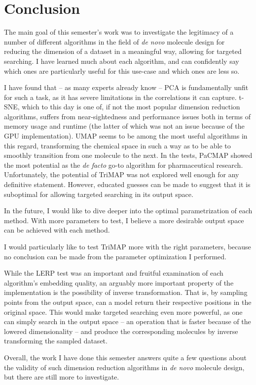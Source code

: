 \chapter{Conclusion}\label{ch:conclusion}


The main goal of this semester's work was to investigate the legitimacy of a number of different algorithms in the field of \textit{de novo} molecule design for reducing the dimension of a dataset in a meaningful way, allowing for targeted searching. I have learned much about each algorithm, and can confidently say which ones are particularly useful for this use-case and which ones are less so.

I have found that -- as many experts already know -- PCA is fundamentally unfit for such a task, as it has severe limitations in the correlations it can capture. t-SNE, which to this day is one of, if not the most popular dimension reduction algorithms, suffers from near-sightedness and performance issues both in terms of memory usage and runtime (the latter of which was not an issue because of the GPU implementation). UMAP seems to be among the most useful algorithms in this regard, transforming the chemical space in such a way as to be able to smoothly transition from one molecule to the next. In the tests, PaCMAP showed the most potential as the \textit{de facto}  go-to algorithm for pharmaceutical research. Unfortunately, the potential of TriMAP was not explored well enough for any definitive statement. However, educated guesses can be made to suggest that it is suboptimal for allowing targeted searching in its output space.

In the future, I would like to dive deeper into the optimal parametrization of each method. With more parameters to test, I believe a more desirable output space can be achieved with each method.

I would particularly like to test TriMAP more with the right parameters, because no conclusion can be made from the parameter optimization I performed.

While the LERP test was an important and fruitful examination of each algorithm's embedding quality, an arguably more important property of the implementation is the possibility of inverse transformation. That is, by sampling points from the output space, can a model return their respective positions in the original space. This would make targeted searching even more powerful, as one can simply search in the output space -- an operation that is faster because of the lowered dimensionality -- and produce the corresponding molecules by inverse transforming the sampled dataset.

Overall, the work I have done this semester answers quite a few questions about the validity of such dimension reduction algorithms in \textit{de novo} molecule design, but there are still more to investigate.